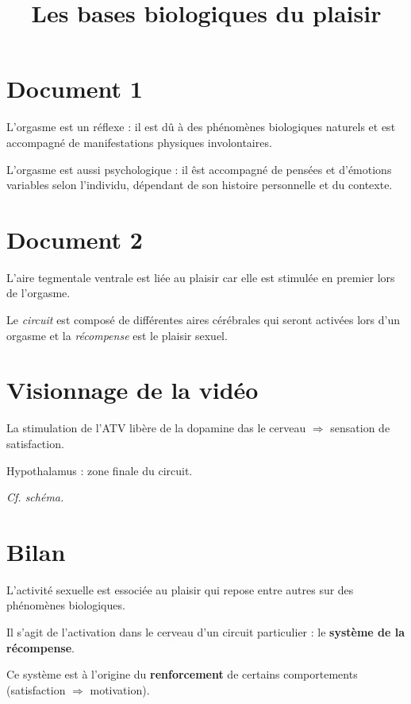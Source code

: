 \documentclass[12pt]{article}
\title{\textbf{Les bases biologiques du plaisir}}
\date{}
\renewcommand{\emph}{\textbf}
\begin{document}
\maketitle

\section*{Document 1}

L'orgasme est un réflexe : il est dû à des phénomènes biologiques naturels et est accompagné de manifestations physiques involontaires.

L'orgasme est aussi psychologique : il êst accompagné de pensées et d'émotions variables selon l'individu, dépendant de son histoire personnelle et du contexte.

\section*{Document 2}

L'aire tegmentale ventrale est liée au plaisir car elle est stimulée en premier lors de l'orgasme.

Le \textit{circuit} est composé de différentes aires cérébrales qui seront activées lors d'un orgasme et la \textit{récompense} est le plaisir sexuel.

\section*{Visionnage de la vidéo}

La stimulation de l'ATV libère de la dopamine das le cerveau $\Rightarrow$ sensation de satisfaction.

Hypothalamus : zone finale du circuit.

\textit{Cf. schéma.}

\section*{Bilan}

L'activité sexuelle est essociée au plaisir qui repose entre autres sur des phénomènes biologiques.

Il s'agit de l'activation dans le cerveau d'un circuit particulier : le \emph{système de la récompense}.

Ce système est à l'origine du \emph{renforcement} de certains comportements (satisfaction $\Rightarrow$ motivation).
\end{document}
